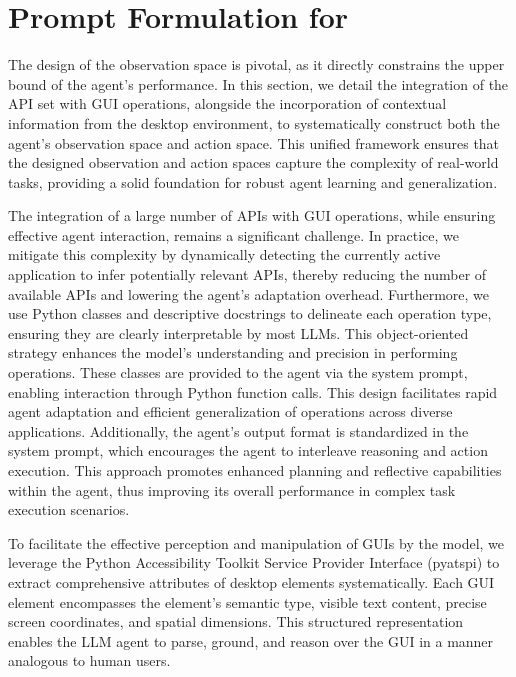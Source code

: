 \section{Prompt Formulation for \model}\label{apdx:agent_prompt}
The design of the observation space is pivotal, as it directly constrains the upper bound of the agent’s performance.
In this section, we detail the integration of the API set with GUI operations, alongside the incorporation of contextual information from the desktop environment, to systematically construct both the agent’s observation space and action space. 
This unified framework ensures that the designed observation and action spaces capture the complexity of real-world tasks, providing a solid foundation for robust agent learning and generalization.

The integration of a large number of APIs with GUI operations, while ensuring effective agent interaction, remains a significant challenge. 
In practice, we mitigate this complexity by dynamically detecting the currently active application to infer potentially relevant APIs, thereby reducing the number of available APIs and lowering the agent’s adaptation overhead. 
Furthermore, we use Python classes and descriptive docstrings to delineate each operation type, ensuring they are clearly interpretable by most LLMs. This object-oriented strategy enhances the model’s understanding and precision in performing operations.
These classes are provided to the agent via the system prompt, enabling interaction through Python function calls. 
This design facilitates rapid agent adaptation and efficient generalization of operations across diverse applications. 
Additionally, the agent’s output format is standardized in the system prompt, which encourages the agent to interleave reasoning and action execution. This approach promotes enhanced planning and reflective capabilities within the agent, thus improving its overall performance in complex task execution scenarios.

To facilitate the effective perception and manipulation of GUIs by the model, we leverage the Python Accessibility Toolkit Service Provider Interface (pyatspi) to extract comprehensive attributes of desktop elements systematically. Each GUI element encompasses the element’s semantic type, visible text content, precise screen coordinates, and spatial dimensions. This structured representation enables the LLM agent to parse, ground, and reason over the GUI in a manner analogous to human users.


